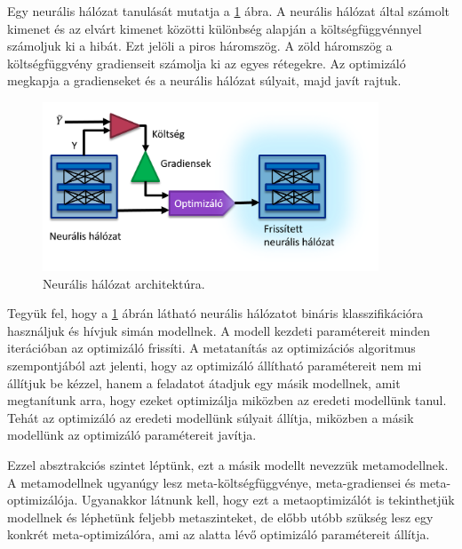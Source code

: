 Egy neurális hálózat tanulását mutatja a \ref{fig:nn-arch} ábra. A neurális hálózat által számolt kimenet és az elvárt kimenet közötti különbség alapján a költségfüggvénnyel számoljuk ki a hibát. Ezt jelöli a piros háromszög. A zöld háromszög a költségfüggvény gradienseit számolja ki az egyes rétegekre. Az optimizáló megkapja a gradienseket és a neurális hálózat súlyait, majd javít rajtuk.

\begin{figure}[!ht]
	\centering
	\includegraphics[width=100mm, keepaspectratio]{figures/nn-arch.png}
	\caption{Neurális hálózat architektúra.}
	\label{fig:nn-arch}
\end{figure}

Tegyük fel, hogy a \ref{fig:nn-arch} ábrán látható neurális hálózatot bináris klasszifikációra használjuk és hívjuk simán modellnek. A modell kezdeti paramétereit minden iterációban az optimizáló frissíti. A metatanítás az optimizációs algoritmus szempontjából azt jelenti, hogy az optimizáló állítható paramétereit nem mi állítjuk be kézzel, hanem a feladatot átadjuk egy másik modellnek, amit megtanítunk arra, hogy ezeket optimizálja miközben az eredeti modellünk tanul. Tehát az optimizáló az eredeti modellünk súlyait állítja, miközben a másik modellünk az optimizáló paramétereit javítja.

Ezzel absztrakciós szintet léptünk, ezt a másik modellt nevezzük metamodellnek. A metamodellnek ugyanúgy lesz meta-költségfüggvénye, meta-gradiensei és meta-optimizálója. Ugyanakkor látnunk kell, hogy ezt a metaoptimizálót is tekinthetjük modellnek és léphetünk feljebb metaszinteket, de előbb utóbb szükség lesz egy konkrét meta-optimizálóra, ami az alatta lévő optimizáló paramétereit állítja. 


